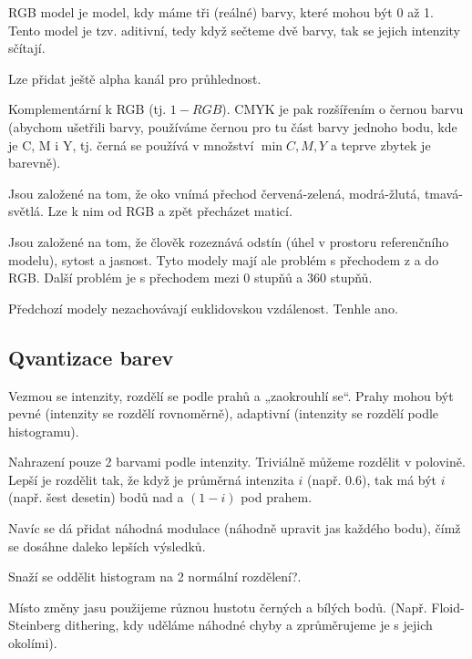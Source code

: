 \documentclass[12pt]{article}					%
\begin{document}
\begin{definice}
	RGB model je model, kdy máme tři (reálné) barvy, které mohou být 0 až 1. Tento model je tzv. aditivní, tedy když sečteme dvě barvy, tak se jejich intenzity sčítají.

	Lze přidat ještě alpha kanál pro průhlednost.
\end{definice}

\begin{definice}
	Komplementární k RGB (tj. $1 - RGB$). CMYK je pak rozšířením o černou barvu (abychom ušetřili barvy, používáme černou pro tu část barvy jednoho bodu, kde je C, M i Y, tj. černá se používá v množství $\min C, M, Y$ a teprve zbytek je barevně).
\end{definice}

\begin{definice}
	Jsou založené na tom, že oko vnímá přechod červená-zelená, modrá-žlutá, tmavá-světlá. Lze k nim od RGB a zpět přecházet maticí.
\end{definice}

\begin{definice}
	Jsou založené na tom, že člověk rozeznává odstín (úhel v prostoru referenčního modelu), sytost a jasnost. Tyto modely mají ale problém s přechodem z a do RGB. Další problém je s přechodem mezi $0$ stupňů a $360$ stupňů.
\end{definice}

\begin{definice}[L*a*b*]
	Předchozí modely nezachovávají euklidovskou vzdálenost. Tenhle ano.
\end{definice}

\subsection{Qvantizace barev}
\begin{definice}[Prahování]
	Vezmou se intenzity, rozdělí se podle prahů a „zaokrouhlí se“. Prahy mohou být pevné (intenzity se rozdělí rovnoměrně), adaptivní (intenzity se rozdělí podle histogramu).
\end{definice}

\begin{definice}[Binarizace]
	Nahrazení pouze 2 barvami podle intenzity. Triviálně můžeme rozdělit v polovině. Lepší je rozdělit tak, že když je průměrná intenzita $i$ (např. $0.6$), tak má být $i$ (např. šest desetin) bodů nad a $(1 - i)$ pod prahem.

	Navíc se dá přidat náhodná modulace (náhodně upravit jas každého bodu), čímž se dosáhne daleko lepších výsledků.
\end{definice}

\begin{definice}
	Snaží se oddělit histogram na 2 normální rozdělení?.
\end{definice}

\begin{definice}[Dithering]
	Místo změny jasu použijeme různou hustotu černých a bílých bodů. (Např. Floid-Steinberg dithering, kdy uděláme náhodné chyby a zprůměrujeme je s jejich okolími).
\end{definice}
\end{document}
